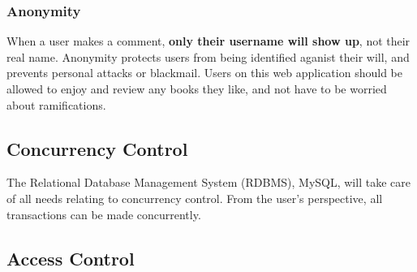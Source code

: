 \documentclass[letter, 12pt, titlepage]{article}
\begin{document}
			\subsubsection{Anonymity}
				When a user makes a comment, \textbf{only their username will show up}, not their real name. Anonymity protects users from being identified aganist their will, and prevents personal attacks or blackmail. Users on this web application should be allowed to enjoy and review any books they like, and not have to be worried about ramifications.
		
		\subsection{Concurrency Control}
			The Relational Database Management System (RDBMS), MySQL, will take care of all needs relating to concurrency control. From the user's perspective, all transactions can be made concurrently. 

		\subsection{Access Control}
\end{document}
